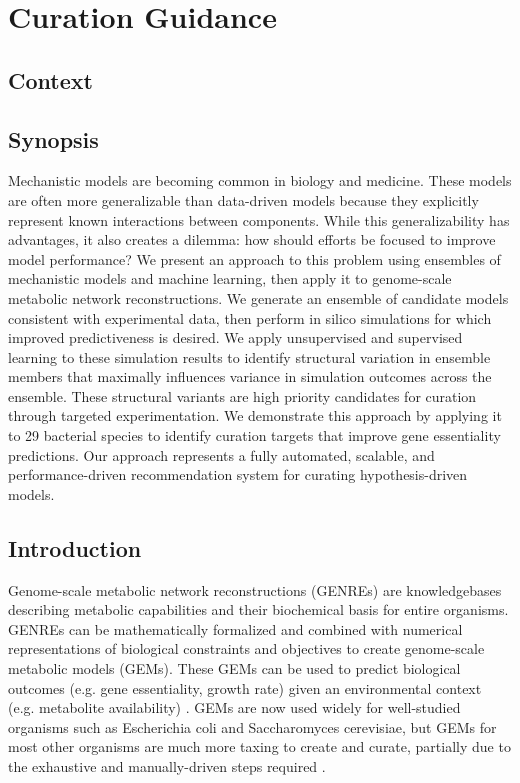 \documentclass[11pt,twocolumn,notitlepage,openany,twoside]{book}
\begin{document}
\chapter{Curation Guidance}
\begin{refsection}

\section{Context}

\section{Synopsis}
Mechanistic models are becoming common in biology and medicine. These models are often more generalizable than data-driven models because they explicitly represent known interactions between components. While this generalizability has advantages, it also creates a dilemma: how should efforts be focused to improve model performance? We present an approach to this problem using ensembles of mechanistic models and machine learning, then apply it to genome-scale metabolic network reconstructions. We generate an ensemble of candidate models consistent with experimental data, then perform in silico simulations for which improved predictiveness is desired. We apply unsupervised and supervised learning to these simulation results to identify structural variation in ensemble members that maximally influences variance in simulation outcomes across the ensemble. These structural variants are high priority candidates for curation through targeted experimentation. We demonstrate this approach by applying it to 29 bacterial species to identify curation targets that improve gene essentiality predictions. Our approach represents a fully automated, scalable, and performance-driven recommendation system for curating hypothesis-driven models.

\section{Introduction}

Genome-scale metabolic network reconstructions (GENREs) are knowledgebases describing metabolic capabilities and their biochemical basis for entire organisms. GENREs can be mathematically formalized and combined with numerical representations of biological constraints and objectives to create genome-scale metabolic models (GEMs). These GEMs can be used to predict biological outcomes (e.g. gene essentiality, growth rate) given an environmental context (e.g. metabolite availability) \cite{Oberhardt2009-iu}. GEMs are now used widely for well-studied organisms such as Escherichia coli and Saccharomyces cerevisiae, but GEMs for most other organisms are much more taxing to create and curate, partially due to the exhaustive and manually-driven steps required \cite{Thiele2010-yq}.


\end{refsection}
\end{document}
